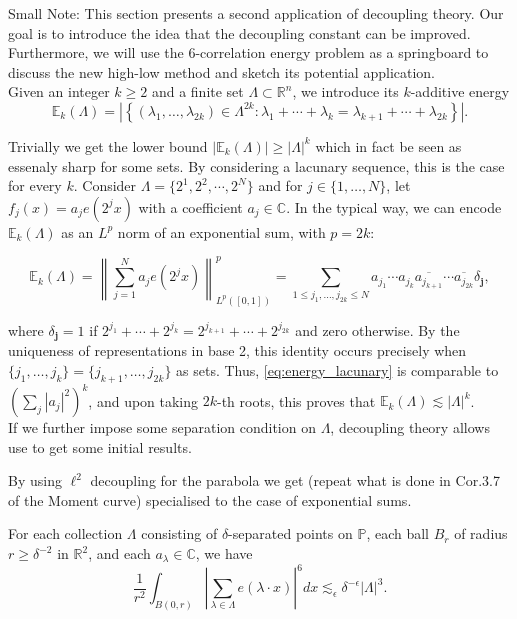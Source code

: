 Small Note: This section presents a second application of decoupling theory. Our goal is to introduce the idea that the decoupling constant can be improved. Furthermore, we will use the 6-correlation energy problem as a springboard to discuss the new high-low method and sketch its potential application.\\


Given an integer $k \geq 2$ and a finite set $\Lambda \subset \mathbb{R}^n$, we introduce its $k$-additive energy
$$
\mathbb{E}_k(\Lambda)=\left|\left\{\left(\lambda_1, \ldots, \lambda_{2 k}\right) \in \Lambda^{2 k}: \lambda_1+\cdots+\lambda_k=\lambda_{k+1}+\cdots+\lambda_{2 k}\right\}\right| .
$$

Trivially we get the lower bound \(\left|\mathbb{E}_k(\Lambda)\right| \geq |\Lambda|^k\) which in fact be seen as essenaly sharp for some sets. By considering a lacunary sequence, this is the case for every \(k\). Consider \(\Lambda = \{2^{1}, 2^{2}, \cdots, 2^{N}\}\) and for \(j \in \{1, \ldots, N\}\), let \(f_{j}(x) = a_{j} e\left(2^{j} x\right)\) with a coefficient \(a_{j} \in \mathbb{C}\). In the typical way, we can encode \(\mathbb{E}_k(\Lambda)\) as an \(L^p\) norm of an exponential sum, with \(p = 2k\):

\begin{equation}\label{eq:energy_lacunary}
\mathbb{E}_k(\Lambda) = \left\|\sum_{j=1}^{N} a_{j} e\left(2^{j} x\right)\right\|_{L^{p}([0,1])}^{p} = \sum_{1 \leq j_{1}, \ldots, j_{2k} \leq N} a_{j_{1}} \cdots a_{j_{k}} \overline{a_{j_{k+1}}} \cdots \overline{a_{j_{2k}}} \delta_{\mathbf{j}},
\end{equation}

where \(\delta_{\mathbf{j}} = 1\) if \(2^{j_{1}} + \cdots + 2^{j_{k}} = 2^{j_{k+1}} + \cdots + 2^{j_{2k}}\) and zero otherwise. By the uniqueness of representations in base 2, this identity occurs precisely when \(\{j_{1}, \ldots, j_{k}\} = \{j_{k+1}, \ldots, j_{2k}\}\) as sets. Thus, \eqref{eq:energy_lacunary} is comparable to \(\left(\sum_{j} |a_{j}|^{2}\right)^{k}\), and upon taking \(2k\)-th roots, this proves that \(\mathbb{E}_k(\Lambda) \lesssim |\Lambda|^{k}\).\\




If we further impose some separation condition on $\Lambda$, decoupling theory allows use to get some initial results.

By using $\ell^2$ decoupling for the parabola we get (repeat what is done in Cor.3.7 of the Moment curve)  specialised to the case of exponential sums.
\begin{thm}\label{thm:exponetial decoupling parabola}
For each collection $\Lambda$ consisting of $\delta$-separated points on $\mathbb{P}$, each ball $B_{r}$ of radius $r \geq \delta^{-2}$ in $\mathbb{R}^2$, and each $a_\lambda \in \mathbb{C}$, we have
\begin{equation}\label{eq:exponetial decoupling parabola}
\frac{1}{r^2} \int_{B(0, r)}\left|\sum_{\lambda \in \Lambda} e(\lambda \cdot x)\right|^6 d x \lesssim_\epsilon \delta^{-\epsilon}|\Lambda|^3.
\end{equation}
\end{thm}

